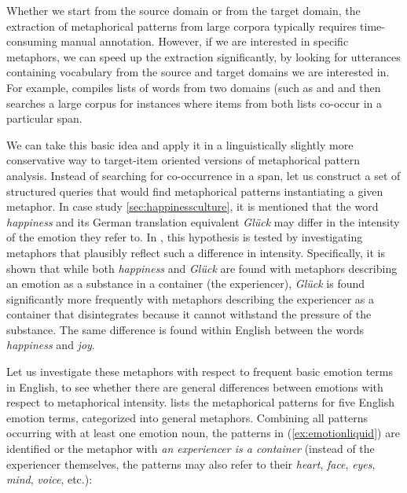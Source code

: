 Whether we start from the source domain or from the target domain, the extraction of metaphorical patterns from large corpora typically requires time\hyp{}consuming manual annotation. However, if we are interested in specific metaphors, we can speed up the extraction significantly, by looking for utterances containing vocabulary from the source and target domains we are interested in. For example, \citet{martin_corpus-based_2006} compiles lists of words from two domains (such as  and  and then searches a large corpus for instances where items from both lists co-occur in a particular span.

We can take this basic idea and apply it in a linguistically slightly more conservative way to target-item oriented versions of metaphorical pattern analysis. Instead of searching for co-occurrence in a span, let us construct a set of structured queries that would find metaphorical patterns instantiating a given metaphor. In case study \ref{sec:happinessculture}, it is mentioned that the word \textit{happiness} and its German translation equivalent \textit{Glück} may differ in the intensity of the emotion they refer to. In \citet{stefanowitsch_happiness_2004}, this hypothesis is tested by investigating metaphors that plausibly reflect such a difference in intensity. Specifically, it is shown that while both \textit{happiness} and \textit{Glück} are found with metaphors describing an emotion as a substance in a container (the experiencer), \textit{Glück} is found significantly more frequently with metaphors describing the experiencer as a container that disintegrates because it cannot withstand the pressure of the substance. The same difference is found within English between the words \textit{happiness} and \textit{joy}.

Let us investigate these metaphors with respect to frequent basic emotion terms in English, to see whether there are general differences between emotions with respect to metaphorical intensity. \citet{stefanowitsch_words_2006} lists the metaphorical patterns for five English emotion terms, categorized into general metaphors. Combining all patterns occurring with at least one emotion noun, the patterns in (\ref{ex:emotionliquid}) are identified or the metaphor  with \textit{an experiencer is a container} (instead of the experiencer themselves, the patterns may also refer to their \textit{heart}, \textit{face}, \textit{eyes}, \textit{mind}, \textit{voice}, etc.):


